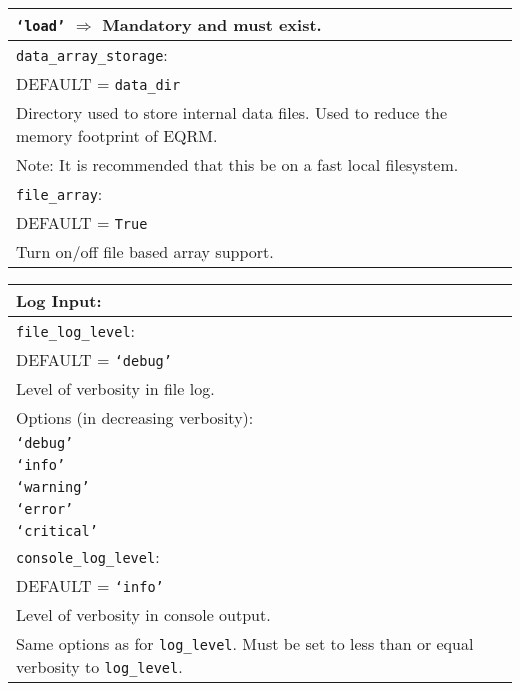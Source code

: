 \begin{tabular}{|p{\textwidth}|}
 \hspace{0.5em} \texttt{`load'} $\Rightarrow$ Mandatory and must exist. \\
\hline \vspace{0.1em} \texttt{data\_array\_storage}: \\
DEFAULT = \texttt{data\_dir} \\
Directory used to store internal data files. Used to reduce the memory footprint
of EQRM. \\
Note: It is recommended that this be on a fast local filesystem. \\
\hline \vspace{0.1em} \texttt{file\_array}: \\
DEFAULT = \texttt{True} \\
Turn on/off file based array support. \\
 
\hline
 \end{tabular}
 
 \vspace{2em}
\begin{tabular}{|p{\textwidth}|}
\hline
\vspace{0.3em} \noindent \Large \textbf{Log Input:} \normalsize \\
\hline \vspace{0.1em} \texttt{file\_log\_level}: \\
DEFAULT = \texttt{`debug'} \\
Level of verbosity in file log. \\
Options (in decreasing verbosity): \\
 \hspace{0.5em} \texttt{`debug'} \\
 \hspace{0.5em} \texttt{`info'} \\
 \hspace{0.5em} \texttt{`warning'} \\
 \hspace{0.5em} \texttt{`error'} \\
 \hspace{0.5em} \texttt{`critical'} \\
\hline \vspace{0.1em} \texttt{console\_log\_level}: \\
DEFAULT = \texttt{`info'} \\
Level of verbosity in console output. \\
Same options as for \texttt{log\_level}. Must be set to less than or equal
verbosity to \texttt{log\_level}. \\
 
\hline
 \end{tabular} 

